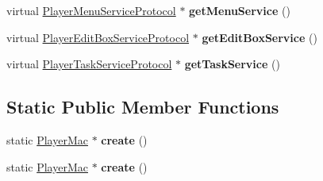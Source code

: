 \begin{DoxyCompactItemize}
virtual \hyperlink{classPlayerMenuServiceProtocol}{Player\+Menu\+Service\+Protocol} $\ast$ {\bfseries get\+Menu\+Service} ()
\item 
\mbox{\label{classPlayerMac_a174376718d123e3df85856891010beda}} 
virtual \hyperlink{classPlayerEditBoxServiceProtocol}{Player\+Edit\+Box\+Service\+Protocol} $\ast$ {\bfseries get\+Edit\+Box\+Service} ()
\item 
\mbox{\label{classPlayerMac_ac0f7059afe0a27cc4d5c3b9f6f3f687e}} 
virtual \hyperlink{classPlayerTaskServiceProtocol}{Player\+Task\+Service\+Protocol} $\ast$ {\bfseries get\+Task\+Service} ()
\end{DoxyCompactItemize}
\subsection*{Static Public Member Functions}
\begin{DoxyCompactItemize}
\item 
\mbox{\label{classPlayerMac_af94b662b2c3032368324ea254b8bc85b}} 
static \hyperlink{classPlayerMac}{Player\+Mac} $\ast$ {\bfseries create} ()
\item 
\mbox{\label{classPlayerMac_a6770f1acc8a712fba7744c63d8bd021c}} 
static \hyperlink{classPlayerMac}{Player\+Mac} $\ast$ {\bfseries create} ()
\end{DoxyCompactItemize}
